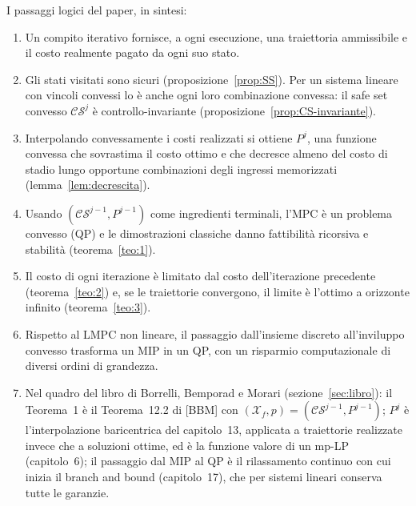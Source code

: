 \documentclass[11pt,a4paper]{article}
\theoremstyle{definition}
\theoremstyle{plain}
\theoremstyle{remark}
\newcommand{\Xf}{\mathcal{X}_f}
\newcommand{\CS}{\mathcal{CS}}
\begin{document}
\noindent
I passaggi logici del paper, in sintesi:
\begin{enumerate}
  \item Un compito iterativo fornisce, a ogni esecuzione, una traiettoria
        ammissibile e il costo realmente pagato da ogni suo stato.
  \item Gli stati visitati sono sicuri (proposizione~\ref{prop:SS}). Per un
        sistema lineare con vincoli convessi lo è anche ogni loro
        combinazione convessa: il safe set convesso $\CS^j$ è
        controllo-invariante (proposizione~\ref{prop:CS-invariante}).
  \item Interpolando convessamente i costi realizzati si ottiene $P^j$, una
        funzione convessa che sovrastima il costo ottimo e che decresce
        almeno del costo di stadio lungo opportune combinazioni degli ingressi
        memorizzati (lemma~\ref{lem:decrescita}).
  \item Usando $(\CS^{j-1},P^{j-1})$ come ingredienti terminali, l'MPC è un
        problema convesso (QP) e le dimostrazioni classiche danno fattibilità
        ricorsiva e stabilità (teorema~\ref{teo:1}).
  \item Il costo di ogni iterazione è limitato dal costo dell'iterazione
        precedente (teorema~\ref{teo:2}) e, se le traiettorie convergono, il
        limite è l'ottimo a orizzonte infinito (teorema~\ref{teo:3}).
  \item Rispetto al LMPC non lineare, il passaggio dall'insieme discreto
        all'inviluppo convesso trasforma un MIP in un QP, con un risparmio
        computazionale di diversi ordini di grandezza.
  \item Nel quadro del libro di Borrelli, Bemporad e Morari
        (sezione~\ref{sec:libro}): il Teorema~1 è il Teorema~12.2 di [BBM]
        con $(\Xf,p)=(\CS^{j-1},P^{j-1})$; $P^j$ è l'interpolazione
        baricentrica del capitolo~13, applicata a traiettorie realizzate
        invece che a soluzioni ottime, ed è la funzione valore di un mp-LP
        (capitolo~6); il passaggio dal MIP al QP è il rilassamento continuo
        con cui inizia il branch and bound (capitolo~17), che per sistemi
        lineari conserva tutte le garanzie.
\end{enumerate}
\end{document}
